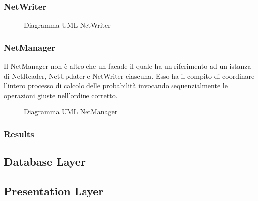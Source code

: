 \subsubsection{NetWriter}
\begin{figure} [H]
	\centering
	
	\caption{Diagramma UML NetWriter}\label{}
\end{figure}
\subsubsection{NetManager}
Il NetManager non è altro che un facade il quale ha un riferimento ad un istanza di NetReader, NetUpdater e NetWriter ciascuna. Esso ha il compito di coordinare l'intero processo di calcolo delle probabilità invocando sequenzialmente le operazioni giuste nell'ordine corretto.
\begin{figure} [H]
	\centering
	
	\caption{Diagramma UML NetManager}\label{}
\end{figure}
\subsubsection{Results}

\subsection{Database Layer}
\subsection{Presentation Layer}
\pagebreak